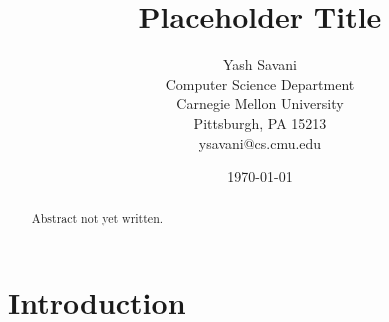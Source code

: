 \documentclass[11pt]{article}
\title{Placeholder Title}
\date{\today}
\author{
	Yash Savani \\
	Computer Science Department \\
	Carnegie Mellon University \\
	Pittsburgh, PA 15213 \\
	ysavani@cs.cmu.edu
}
\begin{document}
\maketitle

\begin{abstract}
    Abstract not yet written.
\end{abstract}

\section{Introduction} \label{sec:intro}


\end{document}
